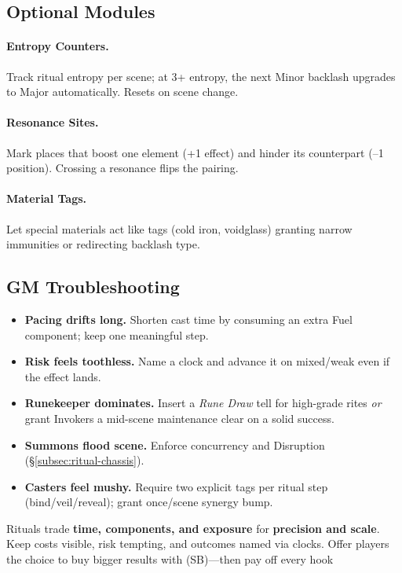 \subsection{Optional Modules}\label{subsec:ritual-modules}
\paragraph{Entropy Counters.} Track ritual entropy per scene; at 3+ entropy, the next Minor backlash upgrades to Major automatically. Resets on scene change.
\paragraph{Resonance Sites.} Mark places that boost one element (+1 effect) and hinder its counterpart (–1 position). Crossing a resonance flips the pairing.
\paragraph{Material Tags.} Let special materials act like tags (cold iron, voidglass) granting narrow immunities or redirecting backlash type.

\subsection{GM Troubleshooting}\label{subsec:ritual-troubleshooting}
\begin{itemize}
\item \textbf{Pacing drifts long.} Shorten cast time by consuming an extra Fuel component; keep one meaningful step.
\item \textbf{Risk feels toothless.} Name a clock and advance it on mixed/weak even if the effect lands.
\item \textbf{Runekeeper dominates.} Insert a \emph{Rune Draw} tell for high-grade rites \emph{or} grant Invokers a mid-scene maintenance clear on a solid success.
\item \textbf{Summons flood scene.} Enforce concurrency and Disruption (\S\ref{subsec:ritual-chassis}).
\item \textbf{Casters feel mushy.} Require two explicit tags per ritual step (bind/veil/reveal); grant once/scene synergy bump.
\end{itemize}

\begin{tcolorbox}[title={Summary},colback=gray!5,colframe=black]
Rituals trade \textbf{time, components, and exposure} for \textbf{precision and scale}. Keep costs visible, risk tempting, and outcomes named via clocks. Offer players the choice to buy bigger results with (SB)—then pay off every hook
\end{tcolorbox}
